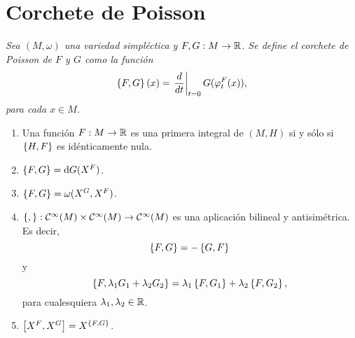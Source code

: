 \section{Corchete de Poisson}\label{sec:poisson}
\begin{defn}
  \em
  Sea $(M,\omega)$ una variedad simpléctica y $F,G: M \rightarrow \mathbb{R}$. Se define el \emph{corchete de Poisson de $F$ y $G$} como la función
\begin{equation*}
  \left\lbrace F,G\right\rbrace(x) = \left.\frac{d}{dt}\right|_{t=0}G(\varphi^F_t(x)),
\end{equation*}
para cada $x \in M$.
\end{defn}
\begin{prop}\leavevmode
  \begin{enumerate}
    \item Una función $F:M \rightarrow \mathbb{R}$ es una primera integral de $(M,H)$ si y sólo si $\left\lbrace H,F\right\rbrace$ es idénticamente nula.
    \item $\left\lbrace F,G\right\rbrace = \mathrm{d} G (X^F)$.
    \item $\left\lbrace F,G\right\rbrace = \omega(X^ G, X^F)$.
    \item $\left\lbrace , \right\rbrace: \mathcal{C}^{\infty}(M) \times \mathcal{C}^{\infty}(M) \rightarrow \mathcal{C}^{\infty}(M)$ es una aplicación bilineal y antisimétrica. Es decir, 
      \begin{equation*}
	\left\lbrace F,G\right\rbrace  =  -\left\lbrace G,F\right\rbrace \\
      \end{equation*}
      y
      \begin{equation*}
	\left\lbrace F,\lambda_1 G_1 + \lambda_2 G_2\right\rbrace  =  \lambda_1 \left\lbrace F,G_1\right\rbrace + \lambda_2 \left\lbrace F,G_2\right\rbrace,
      \end{equation*}
      para cualesquiera $\lambda_1, \lambda_2 \in \mathbb{R}$.
    \item $\left[X^F,X^G\right] = X^{\left\lbrace F,G\right\rbrace}$.
  \end{enumerate}
\end{prop}
